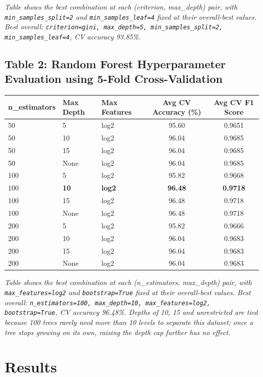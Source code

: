 \documentclass[12pt,a4paper]{article}
\begin{document}
\textit{Table shows the best combination at each (criterion, max\_depth) pair, with
\texttt{min\_samples\_split=2} and \texttt{min\_samples\_leaf=4} fixed at their
overall-best values. Best overall: \texttt{criterion=gini, max\_depth=5,
min\_samples\_split=2, min\_samples\_leaf=4}, CV accuracy 93.85\%.}

\subsection*{Table 2: Random Forest Hyperparameter Evaluation using 5-Fold
Cross-Validation}
\begin{tabular}{lllcc}
\toprule
n\_estimators & Max Depth & Max Features & Avg CV Accuracy (\%) & Avg CV F1 Score \\
\midrule
50  & 5    & log2 & 95.60 & 0.9651 \\
50  & 10   & log2 & 96.04 & 0.9685 \\
50  & 15   & log2 & 96.04 & 0.9685 \\
50  & None & log2 & 96.04 & 0.9685 \\
100 & 5    & log2 & 95.82 & 0.9668 \\
100 & \textbf{10}   & \textbf{log2} & \textbf{96.48} & \textbf{0.9718} \\
100 & 15   & log2 & 96.48 & 0.9718 \\
100 & None & log2 & 96.48 & 0.9718 \\
200 & 5    & log2 & 95.82 & 0.9666 \\
200 & 10   & log2 & 96.04 & 0.9683 \\
200 & 15   & log2 & 96.04 & 0.9683 \\
200 & None & log2 & 96.04 & 0.9683 \\
\bottomrule
\end{tabular}
\vspace{2mm}

\textit{Table shows the best combination at each (n\_estimators, max\_depth) pair,
with \texttt{max\_features=log2} and \texttt{bootstrap=True} fixed at their
overall-best values. Best overall: \texttt{n\_estimators=100, max\_depth=10,
max\_features=log2, bootstrap=True}, CV accuracy 96.48\%. Depths of 10, 15 and
unrestricted are tied because 100 trees rarely need more than 10 levels to separate
this dataset; once a tree stops growing on its own, raising the depth cap further
has no effect.}

\section{Results}
\end{document}
